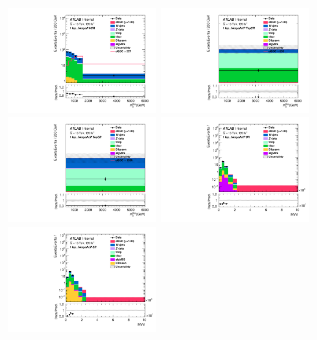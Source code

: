 \begin{figure}[ht]
    \centering
    	\includegraphics[width=0.35\textwidth]{figures/aQGC/Region_disttagMjj_DCRVjetMerged_BMin0_J0_incJet1_L1_T0_incFat1_Y6051_incTag1_Fat1_Prefitlog.pdf}
    	\includegraphics[width=0.35\textwidth]{figures/aQGC/Region_disttagMjj_DCRTopHP_BMin0_J0_incJet1_L1_T0_incFat1_Y6051_incTag1_Fat1_Prefitlog.pdf}
    	\includegraphics[width=0.35\textwidth]{figures/aQGC/Region_disttagMjj_DCRTopLP_BMin0_J0_incJet1_L1_T0_incFat1_Y6051_incTag1_Fat1_Prefitlog.pdf}
    	\includegraphics[width=0.35\textwidth]{figures/aQGC/Region_distMVV_DSRVBSHP_BMin0_J0_incJet1_L1_T0_incFat1_Y6051_incTag1_Fat1_Prefitlog.pdf}
    	\includegraphics[width=0.35\textwidth]{figures/aQGC/Region_distMVV_DSRVBSLP_BMin0_J0_incJet1_L1_T0_incFat1_Y6051_incTag1_Fat1_Prefitlog.pdf}

\end{figure}
